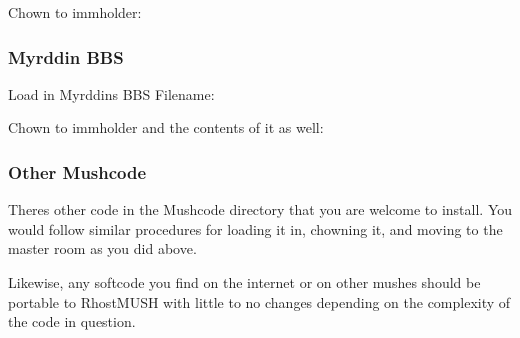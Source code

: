 \documentclass[letterpaper,10pt,english]{sphinxmanual}
\begin{document}
\sphinxAtStartPar
Chown to immholder:

\begin{sphinxVerbatim}[commandchars=\\\{\}]
 
 
  
\end{sphinxVerbatim}


\subsubsection{Myrddin BBS}
\label{\detokenize{gettingstarted:myrddin-bbs}}
\sphinxAtStartPar
Load in Myrddin\textquotesingle{}s BBS
Filename:

\begin{sphinxVerbatim}[commandchars=\\\{\}]
\end{sphinxVerbatim}

\sphinxAtStartPar
Chown to immholder and the contents of it as well:

\begin{sphinxVerbatim}[commandchars=\\\{\}]
 
  
 
\end{sphinxVerbatim}


\subsubsection{Other Mushcode}
\label{\detokenize{gettingstarted:other-mushcode}}
\sphinxAtStartPar
There\textquotesingle{}s other code in the Mushcode directory that you are welcome to install.  You would follow similar procedures
for loading it in, chowning it, and moving to the master room as you did above.

\sphinxAtStartPar
Likewise, any softcode you find on the internet or on other mushes should be portable to RhostMUSH with little to
no changes depending on the complexity of the code in question.
\end{document}
